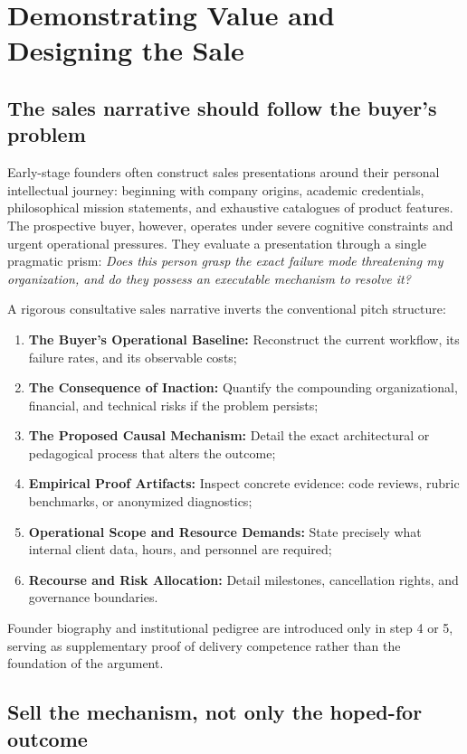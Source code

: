 \section{Demonstrating Value and Designing the Sale}

\subsection{The sales narrative should follow the buyer's problem}

Early-stage founders often construct sales presentations around their personal intellectual journey: beginning with company origins, academic credentials, philosophical mission statements, and exhaustive catalogues of product features. The prospective buyer, however, operates under severe cognitive constraints and urgent operational pressures. They evaluate a presentation through a single pragmatic prism: \textit{Does this person grasp the exact failure mode threatening my organization, and do they possess an executable mechanism to resolve it?}

A rigorous consultative sales narrative inverts the conventional pitch structure:
\begin{enumerate}
\item \textbf{The Buyer's Operational Baseline:} Reconstruct the current workflow, its failure rates, and its observable costs;
\item \textbf{The Consequence of Inaction:} Quantify the compounding organizational, financial, and technical risks if the problem persists;
\item \textbf{The Proposed Causal Mechanism:} Detail the exact architectural or pedagogical process that alters the outcome;
\item \textbf{Empirical Proof Artifacts:} Inspect concrete evidence: code reviews, rubric benchmarks, or anonymized diagnostics;
\item \textbf{Operational Scope and Resource Demands:} State precisely what internal client data, hours, and personnel are required;
\item \textbf{Recourse and Risk Allocation:} Detail milestones, cancellation rights, and governance boundaries.
\end{enumerate}
Founder biography and institutional pedigree are introduced only in step 4 or 5, serving as supplementary proof of delivery competence rather than the foundation of the argument.

\subsection{Sell the mechanism, not only the hoped-for outcome}

